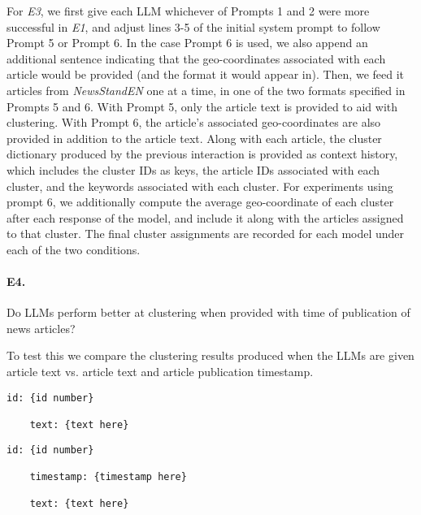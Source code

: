 For \emph{E3}, we first give each LLM whichever of Prompts 1 and 2 were more successful in \emph{E1}, and adjust lines 3-5 of the initial system prompt to follow Prompt 5 or Prompt 6.
In the case Prompt 6 is used, we also append an additional sentence indicating that the geo-coordinates associated with each article would be provided (and the format it would appear in).
Then, we feed it articles from \emph{NewsStandEN} one at a time, in one of the two formats specified in Prompts 5 and 6. 
With Prompt 5, only the article text is provided to aid with clustering.
With Prompt 6, the article's associated geo-coordinates are also provided in addition to the article text.
Along with each article, the cluster dictionary produced by the previous interaction is provided as context history, which includes the cluster IDs as keys, the article IDs associated with each cluster, and the keywords associated with each cluster.
For experiments using prompt 6, we additionally compute the average geo-coordinate of each cluster after each response of the model, and include it along with the articles assigned to that cluster.
The final cluster assignments are recorded for each model under each of the two conditions.


\paragraph{\textbf{E4.}}
Do LLMs perform better at clustering when provided with time of publication of news articles? 

\noindent To test this we compare the clustering results produced when the LLMs are given article text vs. article text and article publication timestamp. 


\begin{lstlisting}[title=Prompt 7: No Timestamp Prompt]
    id: {id number}

    text: {text here}
\end{lstlisting}

\begin{lstlisting}[title=Prompt 8: Timestamp Prompt]
    id: {id number}
    
    timestamp: {timestamp here}

    text: {text here}
\end{lstlisting}

